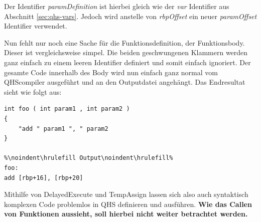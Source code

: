 Der Identifier \textit{paramDefinition} ist hierbei gleich wie der \textit{var} Identifier aus Abschnitt \ref{sec:qhs-vars}. Jedoch wird anstelle von \textit{rbpOffset} ein neuer \textit{paramOffset} Identifier verwendet.

Nun fehlt nur noch eine Sache für die Funktionsdefinition, der Funktionsbody. Dieser ist vergleichsweise simpel. Die beiden geschwungenen Klammern werden ganz einfach zu einem leeren Identifier definiert und somit einfach ignoriert.
Der gesamte Code innerhalb des Body wird nun einfach ganz normal vom QHScompiler ausgeführt und an den Outputdatei angehängt. Das Endresultat sieht wie folgt aus:

\begin{lstlisting}[language=QHS, caption=Finale Definition einer Funktion in QHS]
int foo ( int param1 , int param2 )
{
    "add " param1 ", " param2
}

%\noindent\hrulefill Output\noindent\hrulefill%
foo:
add [rbp+16], [rbp+20]
\end{lstlisting}

Mithilfe von DelayedExecute und TempAssign lassen sich also auch syntaktisch komplexen Code problemlos in QHS definieren und ausführen.
\textbf{Wie das Callen von Funktionen aussieht, soll hierbei nicht weiter betrachtet werden.}


    







